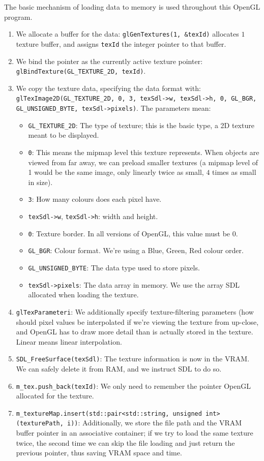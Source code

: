 \documentclass{scrartcl}
\begin{document}
The basic mechanism of loading data to memory is used throughout this OpenGL program.
\begin{enumerate}
\item We allocate a buffer for the data: \lstinline{glGenTextures(1, &texId)} allocates $1$ texture buffer, and assigns \lstinline{texId} the integer pointer to that buffer.
\item We bind the pointer as the currently active texture pointer: \lstinline{glBindTexture(GL_TEXTURE_2D, texId)}.
\item We copy the texture data, specifying the data format with: \lstinline{glTexImage2D(GL_TEXTURE_2D, 0, 3, texSdl->w, texSdl->h, 0, GL_BGR, GL_UNSIGNED_BYTE, texSdl->pixels)}. The parameters mean:
  \begin{itemize}
  \item \lstinline{GL_TEXTURE_2D}: The type of texture; this is the basic type, a 2D texture meant to be displayed.
  \item \lstinline{0}: This means the mipmap level this texture represents. When objects are viewed from far away, we can preload smaller textures (a mipmap level of 1 would be the same image, only linearly twice as small, $4$ times as small in size).
  \item \lstinline{3}: How many colours does each pixel have.
  \item \lstinline{texSdl->w}, \lstinline{texSdl->h}: width and height.
  \item \lstinline{0}: Texture border. In all versions of OpenGL, this value must be $0$.
  \item \lstinline{GL_BGR}: Colour format. We're using a Blue, Green, Red colour order.
  \item \lstinline{GL_UNSIGNED_BYTE}: The data type used to store pixels.
  \item \lstinline{texSdl->pixels}: The data array in memory. We use the array SDL allocated when loading the texture.
  \end{itemize}
\item \lstinline{glTexParameteri}: We additionally specify texture-filtering parameters (how should pixel values be interpolated if we're viewing the texture from up-close, and OpenGL has to draw more detail than is actually stored in the texture. Linear means linear interpolation.
\item \lstinline{SDL_FreeSurface(texSdl)}: The texture information is now in the VRAM. We can safely delete it from RAM, and we instruct SDL to do so.
\item \lstinline{m_tex.push_back(texId)}: We only need to remember the pointer OpenGL allocated for the texture.
\item \lstinline{m_textureMap.insert(std::pair<std::string, unsigned int>(texturePath, i))}: Additionally, we store the file path and the VRAM buffer pointer in an associative container; if we try to load the same texture twice, the second time we can skip the file loading and just return the previous pointer, thus saving VRAM space and time.
\end{enumerate}
\end{document}
